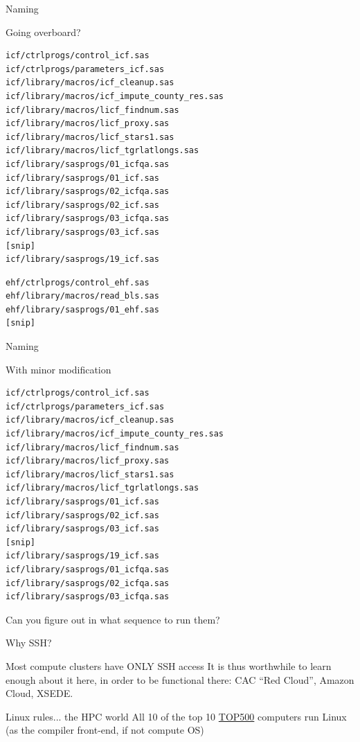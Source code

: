 \documentclass[xcolor=table,compress]{beamer}
\begin{document}
\begin{frame}[fragile]{Naming}
\begin{block}{Going overboard?}
\begin{lstlisting}[language=bash,numbers=none,basicstyle=\tiny]
icf/ctrlprogs/control_icf.sas
icf/ctrlprogs/parameters_icf.sas
icf/library/macros/icf_cleanup.sas
icf/library/macros/icf_impute_county_res.sas
icf/library/macros/licf_findnum.sas
icf/library/macros/licf_proxy.sas
icf/library/macros/licf_stars1.sas
icf/library/macros/licf_tgrlatlongs.sas
icf/library/sasprogs/01_icfqa.sas
icf/library/sasprogs/01_icf.sas
icf/library/sasprogs/02_icfqa.sas
icf/library/sasprogs/02_icf.sas
icf/library/sasprogs/03_icfqa.sas
icf/library/sasprogs/03_icf.sas
[snip]
icf/library/sasprogs/19_icf.sas
\end{lstlisting}
\pause
\begin{lstlisting}[language=bash,numbers=none,basicstyle=\tiny]
ehf/ctrlprogs/control_ehf.sas
ehf/library/macros/read_bls.sas
ehf/library/sasprogs/01_ehf.sas
[snip]
\end{lstlisting}
\end{block}
\end{frame}


\begin{frame}[fragile]{Naming}
\begin{block}{With minor modification}
\begin{lstlisting}[language=bash,numbers=none,basicstyle=\tiny]
icf/ctrlprogs/control_icf.sas
icf/ctrlprogs/parameters_icf.sas
icf/library/macros/icf_cleanup.sas
icf/library/macros/icf_impute_county_res.sas
icf/library/macros/licf_findnum.sas
icf/library/macros/licf_proxy.sas
icf/library/macros/licf_stars1.sas
icf/library/macros/licf_tgrlatlongs.sas
icf/library/sasprogs/01_icf.sas
icf/library/sasprogs/02_icf.sas
icf/library/sasprogs/03_icf.sas
[snip]
icf/library/sasprogs/19_icf.sas
icf/library/sasprogs/01_icfqa.sas
icf/library/sasprogs/02_icfqa.sas
icf/library/sasprogs/03_icfqa.sas
\end{lstlisting}
Can you figure out in what sequence to run them?
\end{block}
\end{frame}





\begin{frame}{Why SSH?}
\begin{block}{Most compute clusters have ONLY SSH access}
It is thus worthwhile to learn enough about it here, in order to be functional there: CAC ``Red Cloud'', Amazon Cloud, XSEDE. 
\end{block}
\begin{block}{Linux rules... the HPC world}
All 10 of the top 10 \href{http://www.top500.org/list/2013/06/}{TOP500} computers run Linux (as the compiler front-end, if not compute OS)
\end{block}
\end{frame}
\end{document}
